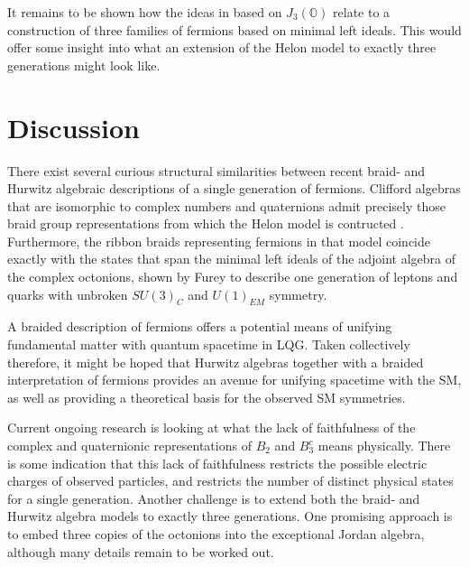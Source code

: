 \documentclass[a4paper]{jpconf}
\begin{document}
It remains to be shown how the ideas in \cite{todorov2018deducing} based on $J_3(\mathbb{O})$ relate to a construction of three families of fermions based on minimal left ideals. This would offer some insight into what an extension of the Helon model to exactly three generations might look like.

\section{Discussion}


There exist several curious structural similarities between recent braid- and Hurwitz algebraic descriptions of a single generation of fermions. Clifford algebras that are isomorphic to complex numbers and quaternions admit precisely those braid group representations from which the Helon model is contructed \cite{gresnigt2017quantum2}. Furthermore, the ribbon braids representing fermions in that model coincide exactly with the states that span the minimal left ideals of the adjoint algebra of the complex octonions, shown by Furey to describe one generation of leptons and quarks with unbroken $SU(3)_{C}$ and $U(1)_{EM}$ symmetry. 

A braided description of fermions offers a potential means of unifying fundamental matter with quantum spacetime in LQG. Taken collectively therefore, it might be hoped that Hurwitz algebras together with a braided interpretation of fermions provides an avenue for unifying spacetime with the SM, as well as providing a theoretical basis for the observed SM symmetries. 

Current ongoing research is looking at what the lack of faithfulness of the complex and quaternionic representations of $B_2$ and $B_3^c$ means physically. There is some indication that this lack of faithfulness restricts the possible electric charges of observed particles, and restricts the number of distinct physical states for a single generation. Another challenge is to extend both the braid- and Hurwitz algebra models to exactly three generations. One promising approach is to embed three copies of the octonions into the exceptional Jordan algebra, although many details remain to be worked out. 
\end{document}
